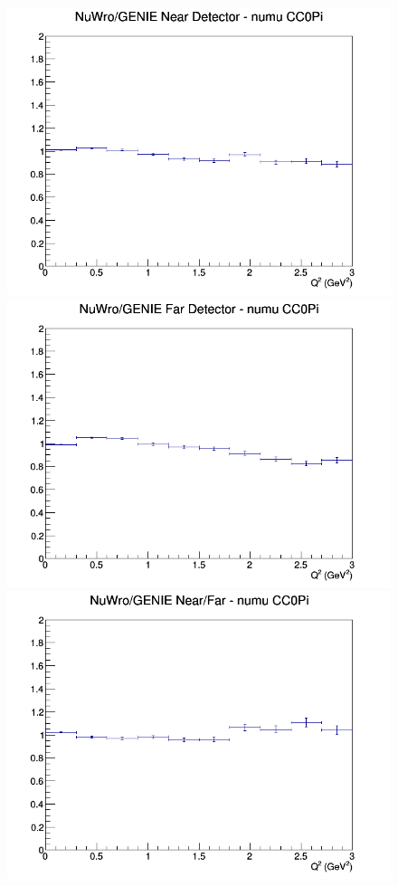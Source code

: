 \begin{figure}[h]
\endminipage
\newline
{}
\includegraphics[width=\linewidth]{eff_Q2/GAr/ratios/CC0Pi_NuWro_GENIE_numu_near_Q2.png}
\endminipage
{}
\includegraphics[width=\linewidth]{eff_Q2/GAr/ratios/CC0Pi_NuWro_GENIE_numu_far_Q2.png}
\endminipage
{}
\includegraphics[width=\linewidth]{eff_Q2/GAr/ratios/CC0Pi_NuWro_GENIE_numu_NF_Q2.png}
\endminipage
\newline
\end{figure}
\clearpage

